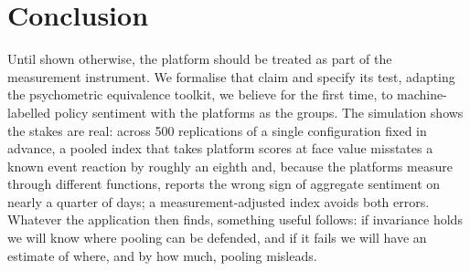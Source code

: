 \section{Conclusion}
\label{sec:conclusion}

Until shown otherwise, the platform should be treated as part of the measurement instrument. We formalise that claim and specify its test, adapting the psychometric equivalence toolkit, we believe for the first time, to machine-labelled policy sentiment with the platforms as the groups. The simulation shows the stakes are real: across 500 replications of a single configuration fixed in advance, a pooled index that takes platform scores at face value misstates a known event reaction by roughly an eighth and, because the platforms measure through different functions, reports the wrong sign of aggregate sentiment on nearly a quarter of days; a measurement-adjusted index avoids both errors. Whatever the application then finds, something useful follows: if invariance holds we will know where pooling can be defended, and if it fails we will have an estimate of where, and by how much, pooling misleads.
